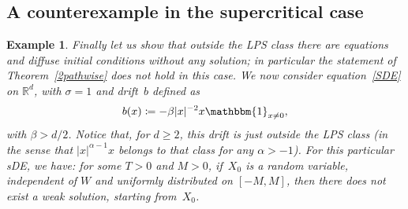 \documentclass[a4paper,10pt]{article}
\newtheorem{example}[theorem]{Example}
\newcommand\1{\mathbbm{1}}
\newcommand{\mr}{\mathbb{R}}
\numberwithin{equation}{section}
\begin{document}
\subsection{A counterexample in the supercritical case}

\begin{example}\label{counterex}
Finally let us show that outside the LPS class there are equations and diffuse initial conditions without any solution; in particular the statement of Theorem~\ref{2pathwise} does not hold in this case. We now consider equation~\eqref{SDE} on $\mr^d$, with $\sigma = 1$ and drift~$b$ defined as
\begin{equation*}
b(x) \coloneqq -\beta |x|^{-2} x  \1_{x\neq0} ,
\end{equation*}
with $\beta>d/2$. Notice that, for $d\ge 2$, this drift is just outside the LPS class \textup{(}in the sense that $|x|^{\alpha-1}x$ belongs to that class for any $\alpha>-1$\textup{)}. For this particular sDE, we have: for some $T>0$ and $M>0$, if~$X_0$ is a random variable, independent of $W$ and uniformly distributed on $[-M,M]$, then there does not exist a weak solution, starting from~$X_0$.
\end{example}
\end{document}
